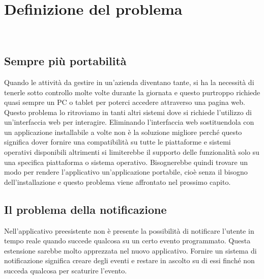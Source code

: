 
\chapter{Definizione del problema}
\label{cap:definizione-problema}

\\



\section{Sempre più portabilità}


Quando le attività da gestire in un'azienda diventano tante, si ha la necessità di tenerle sotto controllo molte volte durante la giornata e questo purtroppo richiede quasi sempre un PC o tablet per poterci accedere attraverso una pagina web. Questo problema lo ritroviamo in tanti altri sistemi dove si richiede l'utilizzo di un'interfaccia web per interagire. Eliminando l'interfaccia web sostituendola con un applicazione installabile a volte non è la soluzione migliore perché questo significa dover fornire una compatibilità su tutte le piattaforme e sistemi operativi disponibili altrimenti si  limiterebbe il supporto delle funzionalità solo su una specifica piattaforma o sistema operativo. Bisognerebbe quindi trovare un modo per rendere l'applicativo un'applicazione portabile, cioè senza il bisogno dell'installazione e questo problema viene affrontato nel prossimo capito.

\section{Il problema della notificazione}

Nell'applicativo preesistente non è presente  la possibilità di notificare l'utente in tempo reale quando succede qualcosa su un certo evento programmato.  Questa estensione sarebbe molto apprezzata nel nuovo applicativo. Fornire un sistema di notificazione significa creare degli eventi e restare in ascolto su di essi finché non succeda qualcosa per scaturire l'evento. \\

